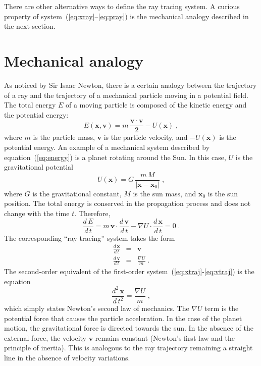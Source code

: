 \documentclass[12pt]{handout}
\begin{document}
There are other alternative ways to define the ray tracing system. A
curious property of system~(\ref{eq:xray}--\ref{eq:pray}) is the
mechanical analogy described in the next section.

\section{Mechanical analogy}
As noticed by Sir Isaac Newton, there is a certain analogy between the
trajectory of a ray and the trajectory of a mechanical particle moving
in a potential field. The total energy $E$ of a moving particle is
composed of the kinetic energy and the potential energy:
\begin{equation}
  \label{eq:energy}
  E(\mathbf{x},\mathbf{v}) = m\,\frac{\mathbf{v} \cdot
    \mathbf{v}}{2} - U(\mathbf{x})\;,
\end{equation}
where $m$ is the particle mass, $\mathbf{v}$ is the particle velocity,
and $- U(\mathbf{x})$ is the potential energy. An example of a
mechanical system described by equation~(\ref{eq:energy}) is a planet
rotating around the Sun. In this case, $U$ is the gravitational
potential
\begin{equation}
  \label{eq:sun}
  U(\mathbf{x}) = G\,\frac{m\,M}{|\mathbf{x}-\mathbf{x}_0|}\;,
\end{equation}
where $G$ is the gravitational constant, $M$ is the sun mass, and
$\mathbf{x}_0$ is the sun position.
The total energy is conserved in the propagation process and does not
change with the time $t$. Therefore,
\begin{equation}
  \label{eq:dt}
  \frac{d\,E}{d\,t} = m\,\mathbf{v} \cdot
  \frac{d\,\mathbf{v}}{d\,t} - \nabla U \cdot
  \frac{d\,\mathbf{x}}{d\,t} = 0\;.
\end{equation}
The corresponding ``ray tracing'' system
takes the form
\begin{eqnarray}
  \label{eq:xtraj}
  \frac{d\,\mathbf{x}}{d\,t} & = & \mathbf{v} \\
  \label{eq:vtraj}
  \frac{d\,\mathbf{v}}{d\,t} & = & \frac{\nabla U}{m}\;.
\end{eqnarray}
The second-order equivalent of the first-order
system~(\ref{eq:xtraj}-\ref{eq:vtraj}) is the equation
\begin{equation}
  \label{eq:xtraj2}
  \frac{d^2\,\mathbf{x}}{d\,t^2} = \frac{\nabla U}{m}\;,
\end{equation}
which simply states Newton's second law of mechanics. The $\nabla U$
term is the potential force that causes the particle acceleration. In
the case of the planet motion, the gravitational force is directed
towards the sun. In the absence of the external force, the velocity
$\mathbf{v}$ remains constant (Newton's first law and the principle of
inertia). This is analogous to the ray trajectory remaining a straight
line in the absence of velocity variations.
\end{document}
